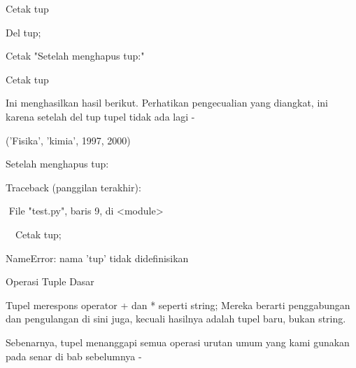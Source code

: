 \documentclass[a4paper,12pt]{report}
\begin{document}
\noindent 
{\fontsize{14pt}{14pt}\selectfont Cetak tup \\} \par
\noindent 
{\fontsize{14pt}{14pt}\selectfont Del tup; \\} \par
\noindent 
{\fontsize{14pt}{14pt}\selectfont Cetak "Setelah menghapus tup:" \\} \par
\noindent 
{\fontsize{14pt}{14pt}\selectfont Cetak tup \\} \par
\noindent 
{\fontsize{14pt}{14pt}\selectfont Ini menghasilkan hasil berikut. Perhatikan pengecualian yang diangkat, ini karena setelah del tup tupel tidak ada lagi - \\} \par
\noindent 
{\fontsize{14pt}{14pt}\selectfont ('Fisika', 'kimia', 1997, 2000) \\} \par
\noindent 
{\fontsize{14pt}{14pt}\selectfont Setelah menghapus tup: \\} \par
\noindent 
{\fontsize{14pt}{14pt}\selectfont Traceback (panggilan terakhir): \\} \par
\noindent 
{\fontsize{14pt}{14pt}\selectfont  $  $ $  $File "test.py", baris 9, di <module> \\} \par
\noindent 
{\fontsize{14pt}{14pt}\selectfont  $  $ $  $ $  $ $  $Cetak tup; \\} \par
\noindent 
{\fontsize{14pt}{14pt}\selectfont NameError: nama 'tup' tidak didefinisikan \\} \par
\noindent 
{\fontsize{14pt}{14pt}\selectfont Operasi Tuple Dasar \\} \par
\noindent 
{\fontsize{14pt}{14pt}\selectfont Tupel merespons operator + dan * seperti string; Mereka berarti penggabungan dan pengulangan di sini juga, kecuali hasilnya adalah tupel baru, bukan string. \\} \par
\noindent 
{\fontsize{14pt}{14pt}\selectfont Sebenarnya, tupel menanggapi semua operasi urutan umum yang kami gunakan pada senar di bab sebelumnya - \\} \par


\end{document}
